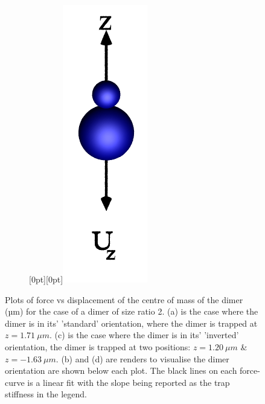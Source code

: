 \begin{figure}[h!]
\begin{subfigure}{.65\linewidth}
		\caption{}
		\label{lam=2_inverted}
	\end{subfigure}\hfill %
	\begin{subfigure}{.25\linewidth}
		\centering
		\raisebox{30pt}[0pt][0pt]{\makebox{}\includegraphics[width=0.3\linewidth, keepaspectratio]{theta=180.png}}
		\caption{}
		\label{small_over_large}
	\end{subfigure}
	\caption{Plots of force vs displacement of the centre of mass of 
		the dimer (µm) for the case of a dimer of size ratio 2. (a) is 
		the case where the dimer is in its' 'standard' orientation, where
		the dimer is trapped at $z = 1.71\ \mu m$. (c) is the case where 
		the dimer is in its' 'inverted' orientation, the dimer is trapped 
		at two positions: $z = 1.20\ \mu m$ \& $z=-1.63\ \mu m$. 
		(b) and (d) are renders to visualise the dimer orientation are shown 
		below each plot. The black lines on each force-curve is a linear 
		fit with the slope being reported as the trap stiffness in the legend.}
		\label{fig:paradigmatic}
\end{figure}

